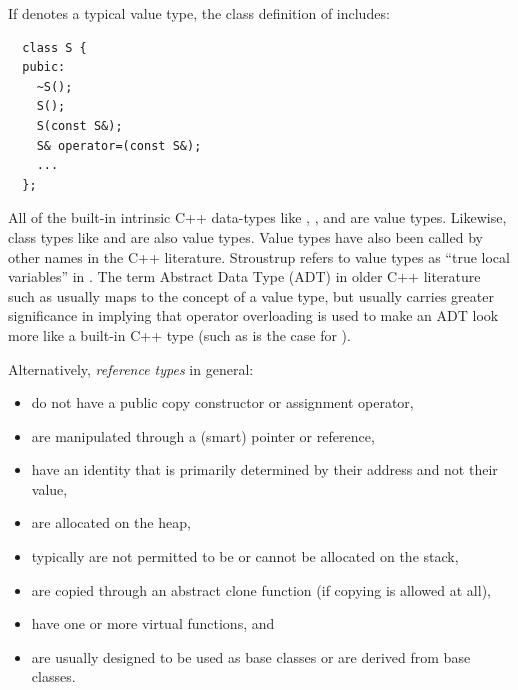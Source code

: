 \documentclass[pdf,ps2pdf,11pt]{SANDreport}
\begin{document}
If {} denotes a typical value type, the class definition of
{} includes:

{\small\begin{verbatim}
  class S {
  pubic:
    ~S();
    S();
    S(const S&);
    S& operator=(const S&);
    ...
  };
\end{verbatim}}

All of the built-in intrinsic C++ data-types like {},
{}, and {} are value types.  Likewise, class
types like {} and {} are also value
types.  Value types have also been called by other names in the C++
literature.  Stroustrup refers to value types as ``true local
variables'' in {}\cite{stroustrup94}.  The term Abstract Data Type
(ADT) in older C++ literature such as {}\cite{AdvancedC++92} usually
maps to the concept of a value type, but usually carries greater
significance in implying that operator overloading is used to make an
ADT look more like a built-in C++ type (such as is the case for
{}).

Alternatively, {}\textit{reference types} in general:

\begin{itemize}

{}\item do not have a public copy constructor or assignment operator,

{}\item are manipulated through a (smart) pointer or reference,

{}\item have an identity that is primarily determined by their address
and not their value,

{}\item are allocated on the heap,

{}\item typically are not permitted to be or cannot be allocated on
the stack,

{}\item are copied through an abstract clone function (if copying is
allowed at all),

{}\item have one or more virtual functions, and

{}\item are usually designed to be used as base classes or are derived
from base classes.

\end{itemize}
\end{document}
